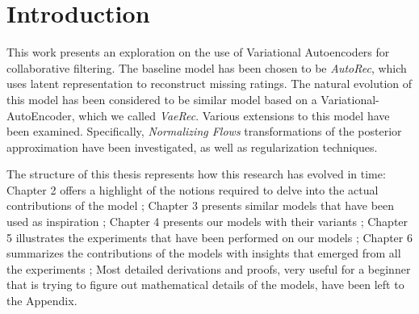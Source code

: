 \chapter{Introduction}

This work presents an exploration on the use of Variational Autoencoders for collaborative
filtering. The baseline model has been chosen to be \emph{AutoRec}\cite{Sedhain2015},
which uses latent representation to reconstruct missing ratings.
The natural evolution of this model has been considered to be similar
model based on a Variational-AutoEncoder, which we called \emph{VaeRec}.
Various extensions to this model have been examined.
Specifically, \emph{Normalizing Flows} transformations of the posterior approximation 
have been investigated, as well as regularization techniques.

The structure of this thesis represents how this research has evolved in time:
Chapter 2 offers a highlight of the notions required to delve into the 
actual contributions of the model ;
Chapter 3 presents similar models that have been used as inspiration ;
Chapter 4 presents our models with their variants ;
Chapter 5 illustrates the experiments that have been performed on our models ;
Chapter 6 summarizes the contributions of the models with insights that emerged from all the experiments ;
Most detailed derivations and proofs, very useful for a beginner that is trying to figure
out mathematical details of the models, have been left to the Appendix.

